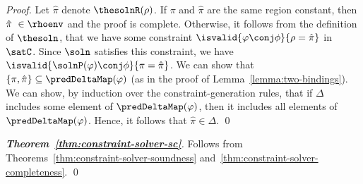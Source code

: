 \begin{proof}
Let $\hat{\pi}$ denote $\thesolnR(\rho)$. If $\pi$ and $\hat{\pi}$ are the same region
constant, then $\hat{\pi}\ \in \rhoenv$ and the proof is complete.
%
Otherwise, it follows from the definition of $\thesoln$, that we have some constraint
$\isvalid{\varphi \conj \phi}{\rho = \hat{\pi}}$ in $\satC$.
Since $\soln$ satisfies this constraint, we have
$\isvalid{\solnP(\varphi) \conj \phi}{\pi = \hat{\pi}}$.
We can show that $\{ \pi, \hat{\pi} \} \subseteq \predDeltaMap(\varphi)$
(as in the proof of Lemma~\ref{lemma:two-bindings}).
We can show, by induction over the constraint-generation rules, that if $\Delta$
includes some element of $\predDeltaMap(\varphi)$, then it includes all elements of $\predDeltaMap(\varphi)$.
Hence, it follows that $\hat{\pi} \in \Delta$.
\qed
%
\end{proof}


\begin{proof}[\textbf{Theorem~\ref{thm:constraint-solver-sc}}]

Follows from Theorems~\ref{thm:constraint-solver-soundness} and~\ref{thm:constraint-solver-completeness}.
\qed
\end{proof}

